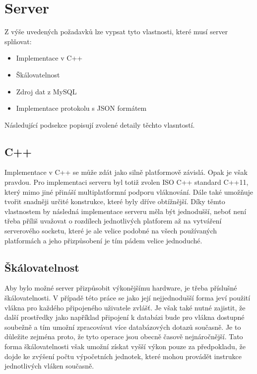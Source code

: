\documentclass[thesis=B,czech]{FITthesis}[2013/10/20]
\begin{document}
\section{Server}

Z výše uvedených požadavků lze vypsat tyto vlastnosti, které musí server splňovat:

\begin{itemize}
  \item{Implementace v C++}
  \item{Škálovatelnost}
  \item{Zdroj dat z MySQL}
  \item{Implementace protokolu s JSON formátem}
\end{itemize}

Následující podsekce popisují zvolené detaily těchto vlasntostí.

\subsection{C++}

Implementace v C++ se může zdát jako silně platformově závislá. Opak je však pravdou. Pro implementaci serveru byl totiž zvolen ISO C++ standard C++11, který mimo jiné přináší multiplatformní podporu vláknování. Dále také umožňuje tvořit snadněji určité konstrukce, které byly dříve obtížnější. Díky těmto vlastnostem by následná implementace serveru měla být jednodušší, neboť není třeba příliš uvažovat o rozdílech jednotlivých platforem až na vytváření serverového socketu, které je ale velice podobné na všech používaných platformách a jeho přizpůsobení je tím pádem velice jednoduché.

\subsection{Škálovatelnost}

Aby bylo možné server přizpůsobit výkonějšímu hardware, je třeba příslušné škálovatelnosti. V případě této práce se jako její nejjednodušší forma jeví použití vlákna pro každého připojeného uživatele zvlášť. Je však také nutné zajistit, že další prostředky jako například připojení k databázi bude pro vlákna dostupné soubežně a tím umožní zpracovávat více databázových dotazů současně. Je to důležite zejména proto, že tyto operace jsou obecně časově nejnáročnější. Tato forma škálovatelnosti však umožní získat vyšší výkon pouze za předpokladu, že dojde ke zvýšení počtu výpočetních jednotek, které mohou provádět instrukce jednotlivých vláken současně.
\end{document}
